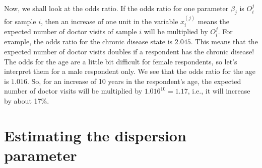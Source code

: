 \documentclass[a4paper,11pt]{article}
\begin{document}
Now, we shall look at the odds ratio. If the odds ratio for one parameter $\beta_j$ is $O_i^j$ for sample $i$, then an increase of one unit in the variable $x_i^{(j)}$ means the expected number of doctor visits of sample $i$ will be multiplied by  $O_i^j$. For example, the odds ratio for the chronic disease state is $2.045$. This means that the expected number of doctor visits doubles if a respondent has the chronic disease! The odds for the age are a little bit difficult for female respondents, so let's interpret them for a male respondent only. We see that the odds ratio for the age is $1.016$. So, for an increase of 10 years in the respondent's age, the expected number of doctor visits will be multiplied by $1.016^{10} = 1.17$, i.e., it will increase by about 17\%.

\section{Estimating the dispersion parameter}



\end{document}
